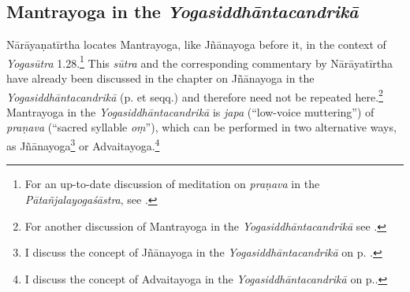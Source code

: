 \subsection{Mantrayoga in the \textit{Yogasiddhāntacandrikā}}
\label{mantrayogaintrocandrika}
Nārāyaṇatīrtha locates Mantrayoga, like Jñānayoga before it, in the context of \textit{Yogasūtra} 1.28.\footnote{For an up-to-date discussion of meditation on \textit{praṇava} in the \emph{Pātañjalayogaśāstra}, see \citeauthor[2009: 276-280]{maas2009}.} This \textit{sūtra} and the corresponding commentary by Nārāyatīrtha have already been discussed in the chapter on Jñānayoga in the \textit{Yogasiddhāntacandrikā} (p.\pageref{jnanayogaintrocandrika} et seqq.) and therefore need not be repeated here.\footnote{For another discussion of Mantrayoga in the \textit{Yogasiddhāntacandrikā} see \citeauthor[2004: 71-76]{penna2004}.} Mantrayoga in the \textit{Yogasiddhāntacandrikā} is \textit{japa} (``low-voice muttering'') of \textit{praṇava} (``sacred syllable \textit{oṃ}''), which can be performed in two alternative ways, as Jñānayoga\footnote{I discuss the concept of Jñānayoga in the \textit{Yogasiddhāntacandrikā} on p. \pageref{jnanayogaintrocandrika}.} or Advaitayoga.\footnote{I discuss the concept of Advaitayoga in the \textit{Yogasiddhāntacandrikā} on p.\pageref{advaitayogaintrocandrika}.}      
